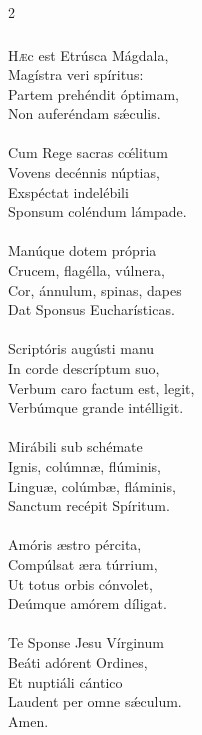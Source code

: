 \documentclass[9pt,twoside]{extarticle}
\begin{document}
\begin{multicols}{2}
\subsubsection*{\center {}}
\begin{center}\end{center}
\lettrine{H}æc est Etrúsca Mágdala,\\
Magístra veri spíritus:\\
Partem prehéndit óptimam,\\
Non auferéndam sǽculis.\\
\\
Cum Rege sacras cœ́litum\\
Vovens decénnis núptias,\\
Exspéctat indelébili\\
Sponsum coléndum lámpade.\\
\\
Manúque dotem própria\\
Crucem, flagélla, vúlnera,\\
Cor, ánnulum, spinas, dapes\\
Dat Sponsus Eucharísticas.\\
\\
Scriptóris augústi manu\\
In corde descríptum suo,\\
Verbum caro factum est, legit,\\
Verbúmque grande intélligit.\\
\\
Mirábili sub schémate\\
Ignis, colúmnæ, flúminis,\\
Linguæ, colúmbæ, fláminis,\\
Sanctum recépit Spíritum.\\
\\
Amóris æstro pércita,\\
Compúlsat æra túrrium,\\
Ut totus orbis cónvolet,\\
Deúmque amórem díligat.\\
\\
Te Sponse Jesu Vírginum\\
Beáti adórent Ordines,\\
Et nuptiáli cántico\\
Laudent per omne sǽculum.\\
Amen.


\end{multicols}
\end{document}

